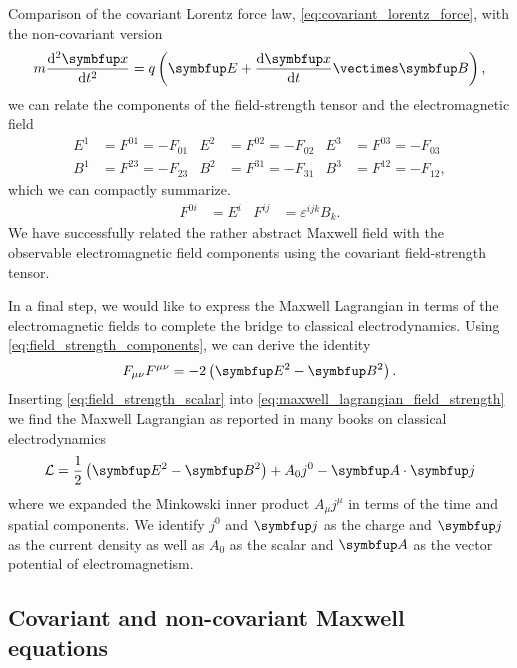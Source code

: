 Comparison of the covariant Lorentz force law, \cref{eq:covariant_lorentz_force}, with the non-covariant version
\begin{equation}
	m
	\odv[order={2}]{\vb{x}}{t}
	=
	q\left(
		\vb{E}
		+
		\odv{\vb{x}}{t}
		\vcross
		\vb{B}
	\right)
	\label{eq:lorentz_force}
	,
\end{equation}
we can relate the components of the field-strength tensor and the electromagnetic field~\cite[p.~245]{Zee2013}
\begin{align}
	E^1
	&=
	F^{01}
	=
	-
	F_{01}
	&
	E^2
	&=
	F^{02}
	=
	-
	F_{02}
	&
	E^3
	&=
	F^{03}
	=
	-
	F_{03}
	\\
	B^1
	&=
	F^{23}
	=
	-
	F_{23}
	&
	B^2
	&=
	F^{31}
	=
	-
	F_{31}
	&
	B^3
	&=
	F^{12}
	=
	-
	F_{12}
	,
\end{align}
which we can compactly summarize.~\cite[p.~336]{Srednicki2007}
\begin{align}
	F^{0i}
	&=
	E^i
	&
	F^{ij}
	&=
	\varepsilon^{ijk}
	B_k
	\label{eq:field_strength_components}
	.
\end{align}
We have successfully related the rather abstract Maxwell field with the observable electromagnetic field components using the covariant field-strength tensor.

In a final step, we would like to express the Maxwell Lagrangian in terms of the electromagnetic fields to complete the bridge to classical electrodynamics.
Using \cref{eq:field_strength_components}, we can derive the identity~\cite[p.~142]{Greiner2013}
\begin{equation}
	F_{\mu\nu}
	F^{\mu\nu}
	=
	-2
	\left(
		\vb{E}^2
		-
		\vb{B}^2
	\right)
	\label{eq:field_strength_scalar}
	.
\end{equation}
Inserting \cref{eq:field_strength_scalar} into \cref{eq:maxwell_lagrangian_field_strength} we find the Maxwell Lagrangian as reported in many books on classical electrodynamics
\begin{equation}
	\mathcal{L}
	=
	\frac{1}{2}
	\left(
		\vb{E}^2
		-
		\vb{B}^2
	\right)
	+
	A_0j^0
	-
	\vb{A}
	\vdot
	\vb{j}
\end{equation}
where we expanded the Minkowski inner product $A_\mu j^\mu$ in terms of the time and spatial components.
We identify $j^0$ and $\vb{j}$ as the charge and $\vb{j}$ as the current density as well as $A_0$ as the scalar and $\vb{A}$ as the vector potential of electromagnetism.

\subsection{Covariant and non-covariant Maxwell equations}

